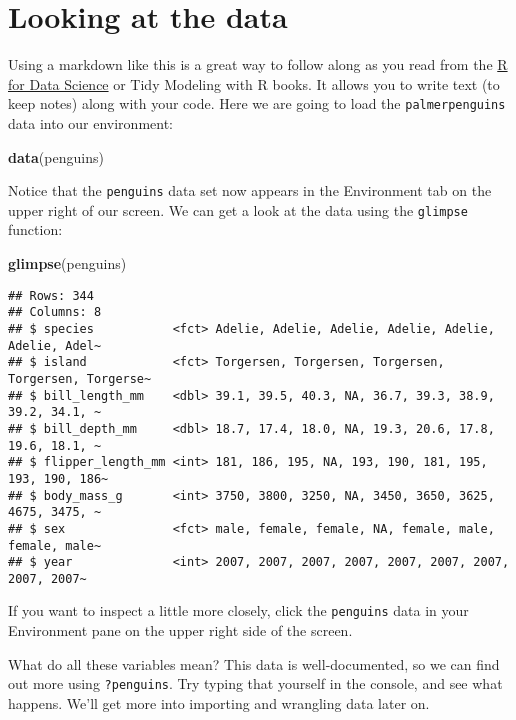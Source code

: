 \documentclass[
]{article}
\author{}
\date{\vspace{-2.5em}}
\newenvironment{Shaded}{\begin{snugshade}}{\end{snugshade}}
\newcommand{\FunctionTok}[1]{\textcolor[rgb]{0.13,0.29,0.53}{\textbf{#1}}}
\newcommand{\NormalTok}[1]{#1}
\begin{document}
\section{Looking at the data}\label{looking-at-the-data}

Using a markdown like this is a great way to follow along as you read
from the \href{https://r4ds.hadley.nz}{R for Data Science} or Tidy
Modeling with R books. It allows you to write text (to keep notes) along
with your code. Here we are going to load the \texttt{palmerpenguins}
data into our environment:

\begin{Shaded}
\begin{Highlighting}[]
\FunctionTok{data}\NormalTok{(penguins)}
\end{Highlighting}
\end{Shaded}

Notice that the \texttt{penguins} data set now appears in the
Environment tab on the upper right of our screen. We can get a look at
the data using the \texttt{glimpse} function:

\begin{Shaded}
\begin{Highlighting}[]
\FunctionTok{glimpse}\NormalTok{(penguins)}
\end{Highlighting}
\end{Shaded}

\begin{verbatim}
## Rows: 344
## Columns: 8
## $ species           <fct> Adelie, Adelie, Adelie, Adelie, Adelie, Adelie, Adel~
## $ island            <fct> Torgersen, Torgersen, Torgersen, Torgersen, Torgerse~
## $ bill_length_mm    <dbl> 39.1, 39.5, 40.3, NA, 36.7, 39.3, 38.9, 39.2, 34.1, ~
## $ bill_depth_mm     <dbl> 18.7, 17.4, 18.0, NA, 19.3, 20.6, 17.8, 19.6, 18.1, ~
## $ flipper_length_mm <int> 181, 186, 195, NA, 193, 190, 181, 195, 193, 190, 186~
## $ body_mass_g       <int> 3750, 3800, 3250, NA, 3450, 3650, 3625, 4675, 3475, ~
## $ sex               <fct> male, female, female, NA, female, male, female, male~
## $ year              <int> 2007, 2007, 2007, 2007, 2007, 2007, 2007, 2007, 2007~
\end{verbatim}

If you want to inspect a little more closely, click the
\texttt{penguins} data in your Environment pane on the upper right side
of the screen.

What do all these variables mean? This data is well-documented, so we
can find out more using \texttt{?penguins}. Try typing that yourself in
the console, and see what happens. We'll get more into importing and
wrangling data later on.
\end{document}
